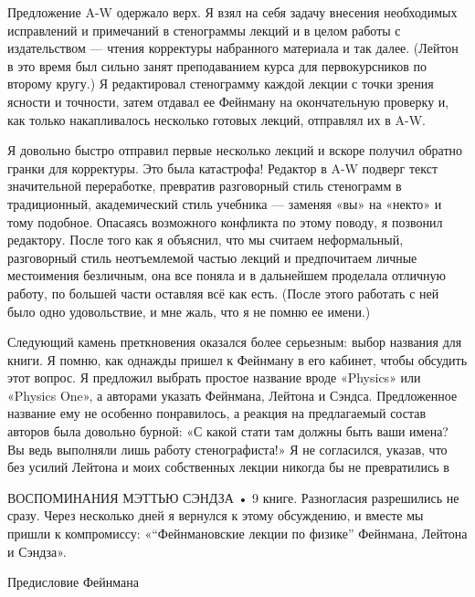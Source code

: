 \documentclass[11pt,oneside]{article}
\begin{document}
Предложение A-W одержало верх. Я взял на себя задачу внесения необходимых исправлений и примечаний в стенограммы лекций и в целом работы с издательством --- чтения корректуры набранного материала и так далее. (Лейтон в это время был сильно занят преподаванием курса для первокурсников по второму кругу.) Я редактировал стенограмму каждой лекции с точки зрения ясности и точности, затем отдавал ее Фейнману на окончательную проверку и, как только накапливалось несколько готовых лекций, отправлял их в A-W.\par



Я довольно быстро отправил первые несколько лекций и вскоре получил обратно гранки для корректуры. Это была катастрофа! Редактор в A-W подверг текст значительной переработке, превратив разговорный стиль стенограмм в традиционный, академический стиль учебника --- заменяя «вы» на «некто» и тому подобное. Опасаясь возможного конфликта по этому поводу, я позвонил редактору. После того как я объяснил, что мы считаем неформальный, разговорный стиль неотъемлемой частью лекций и предпочитаем личные местоимения безличным, она все поняла и в дальнейшем проделала отличную работу, по большей части оставляя всё как есть. (После этого работать с ней было одно удовольствие, и мне жаль, что я не помню ее имени.)\par



Следующий камень преткновения оказался более серьезным: выбор названия для книги. Я помню, как однажды пришел к Фейнману в его кабинет, чтобы обсудить этот вопрос. Я предложил выбрать простое название вроде «Physics» или «Physics One», а авторами указать Фейнмана, Лейтона и Сэндса. Предложенное название ему не особенно понравилось, а реакция на предлагаемый состав авторов была довольно бурной: «С какой стати там должны быть ваши имена? Вы ведь выполняли лишь работу стенографиста!» Я не согласился, указав, что без усилий Лейтона и моих собственных лекции никогда бы не превратились в\par



ВОСПОМИНАНИЯ МЭТТЬЮ СЭНДЗА • 9 книге. Разногласия разрешились не сразу. Через несколько дней я вернулся к этому обсуждению, и вместе мы пришли к компромиссу: «“Фейнмановские лекции по физике” Фейнмана, Лейтона и Сэндза».\par



Предисловие Фейнмана\par
\end{document}
